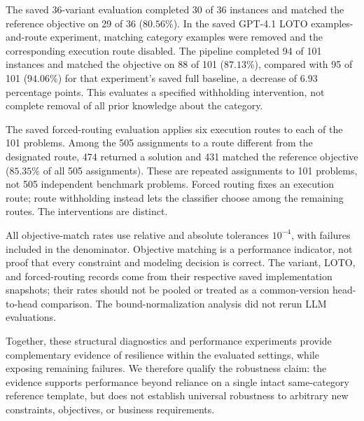 \documentclass[10pt]{article}
\begin{document}
The saved 36-variant evaluation completed 30 of 36 instances and
matched the reference objective on 29 of 36 ($80.56\%$).
In the saved GPT-4.1 LOTO examples-and-route experiment,
matching category examples were removed and the corresponding
execution route disabled. The pipeline completed 94 of 101
instances and matched the objective on 88 of 101 ($87.13\%$),
compared with 95 of 101 ($94.06\%$) for that experiment's saved
full baseline, a decrease of $6.93$ percentage points.
This evaluates a specified withholding intervention, not complete
removal of all prior knowledge about the category.

The saved forced-routing evaluation applies six execution routes
to each of the 101 problems.
Among the 505 assignments to a route different from the designated
route, 474 returned a solution and 431 matched the reference
objective ($85.35\%$ of all 505 assignments).
These are repeated assignments to 101 problems, not 505 independent
benchmark problems. Forced routing fixes an execution route;
route withholding instead lets the classifier choose among the
remaining routes. The interventions are distinct.

All objective-match rates use relative and absolute tolerances
$10^{-4}$, with failures included in the denominator.
Objective matching is a performance indicator, not proof that every
constraint and modeling decision is correct.
The variant, LOTO, and forced-routing records come from their
respective saved implementation snapshots; their rates should not
be pooled or treated as a common-version head-to-head comparison.
The bound-normalization analysis did not rerun LLM evaluations.

Together, these structural diagnostics and performance experiments
provide complementary evidence of resilience within the evaluated
settings, while exposing remaining failures.
We therefore qualify the robustness claim: the evidence supports
performance beyond reliance on a single intact same-category
reference template, but does not establish universal robustness
to arbitrary new constraints, objectives, or business requirements.
\endgroup
\end{document}

